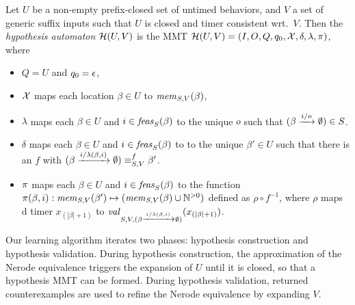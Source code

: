 \begin{definition}
  Let $U$ be a non-empty prefix-closed set of untimed behaviors,
  and $V$ a set of generic suffix inputs such that
$U$ is closed and timer consistent wrt.\ $V$. Then the
{\em hypothesis automaton} $\hypoof UV$ is the MMT
$\hypoof UV = (I, O, Q, q_0, \vars, \delta, \lambda, \remap)$, where
\begin{itemize}
\item $Q = U$ and $q_0 = \emptyword$,
\item $\vars$ maps each location $\beta\in U$ to $\apprgetmemorable{S}{\beta}{V}$,
\item $\lambda$ maps each $\beta \in U$ and $i \in \feasibleinputs{\beta}{S}$ to
  the unique $o$ such that $\extend{\beta}{i}{o} \in S$. 
\item $\delta$ maps each $\beta \in U$ and
  $i \in \feasibleinputs{\beta}{S}$ to
  to the unique $\beta' \in U$ such that there is an $f$ with
  $\extend{\beta}{i}{\lambda(\beta,i)} \equiv_{S,V}^f \beta'$.
\item $\remap$
 maps each $\beta \in U$ and $i \in \feasibleinputs{\beta}{S}$ to
  the function
  $\remap(\beta,i):\apprgetmemorable{S}{\beta'}{V} \mapsto (\apprgetmemorable{S}{\beta}{V} \cup \natplus)$ defined as $\rho \circ f^{-1}$, where $\rho$ maps  d
  timer $x_{(|\beta|+1)}$ to
 $\apprgetassignment{S}{\extend{\beta}{i}{\lambda(\beta,i)}}{V}(x_{(|\beta|+1)})$.
\end{itemize}
\end{definition}


Our learning algorithm iterates two phases: hypothesis construction and
hypothesis validation.
During hypothesis construction, 
the approximation of the Nerode equivalence triggers the expansion of
$U$ until it is closed, so that a hypothesis MMT can be formed.
During hypothesis validation, returned counterexamples are used to refine
the Nerode equivalence by expanding $V$.


